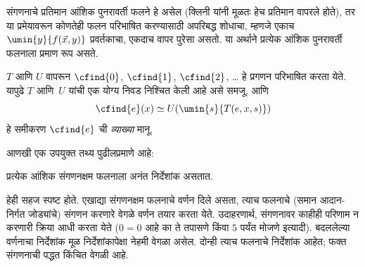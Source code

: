 \documentclass[../../../include/open-logic-section]{subfiles}
\begin{document}
संगणनाचे प्रतिमान आंशिक पुनरावर्ती फलने हे असेल (क्लिनी यांनी
मूळतः हेच प्रतिमान वापरले होते), तर या प्रमेयावरून कोणतेही फलन
परिभाषित करण्यासाठी अपरिबद्ध शोधाचा, म्हणजे एकाच
$\umin{y}{f(\vec x, y)}$ प्रवर्तकाचा, एकदाच वापर पुरेसा असतो.
या अर्थाने प्रत्येक आंशिक पुनरावर्ती फलनाला प्रमाण रूप असते.

$T$ आणि $U$ वापरून $\cfind{0}$, $\cfind{1}$, $\cfind{2}$, \dots
हे प्रगणन परिभाषित करता येते. यापुढे $T$ आणि~$U$ यांची एक योग्य
निवड निश्चित केली आहे असे समजू, आणि
\[
\cfind{e}(x) \simeq U(\umin{s}{T(e,x,s)})
\]
हे समीकरण $\cfind{e}$ ची \emph{व्याख्या} मानू.

आणखी एक उपयुक्त तथ्य पुढीलप्रमाणे आहे:

\begin{thm}
प्रत्येक आंशिक संगणनक्षम फलनाला अनंत निर्देशांक असतात.
\end{thm}

हेही सहज स्पष्ट होते. एखाद्या संगणनक्षम फलनाचे वर्णन दिले असता,
त्याच फलनाचे (समान आदान-निर्गत जोड्यांचे) संगणन करणारे वेगळे वर्णन
तयार करता येते. उदाहरणार्थ, संगणनावर काहीही परिणाम न करणारी क्रिया
आधी करता येते ($0 = 0$ आहे का ते तपासणे किंवा $5$ पर्यंत मोजणे इत्यादी).
बदललेल्या वर्णनाचा निर्देशांक मूळ निर्देशांकापेक्षा नेहमी वेगळा असेल.
दोन्ही त्याच फलनाचे निर्देशांक आहेत; फक्त संगणनाची पद्धत किंचित वेगळी आहे.
\end{document}
